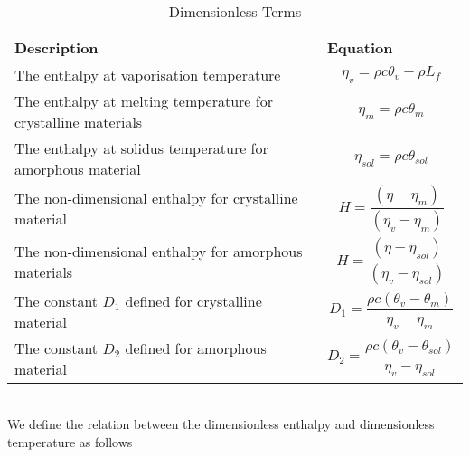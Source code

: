 \begin{table}[htbp]
\begin{tabular}{|m{27em}|m{12em}|} %
\hline
\textbf{Description} & \textbf{Equation} \\ %
\hline %
The enthalpy at vaporisation temperature &  \begin{equation}
    \eta_v = \rho c \theta_v + \rho L_f \label{eq:Enthalpy_vapour}
\end{equation} \\
\hline
The enthalpy at melting temperature for crystalline materials & \begin{equation}  \eta_m = \rho c \theta_m  \end{equation}\\
\hline
The enthalpy at solidus temperature for amorphous material & \begin{equation}\eta_{sol}=\rho c \theta_{sol} \end{equation}\\
\hline
The non-dimensional enthalpy for crystalline material & \begin{equation} H = \frac{(\eta - \eta_m )}{(\eta_v - \eta_m)}\end{equation} \\
\hline
The non-dimensional enthalpy for amorphous materials & \begin{equation}H = \frac{(\eta - \eta_{sol} )}{(\eta_v - \eta_{sol})} \label{eq:liqudiousnonenahlpy}\end{equation}\\
\hline
The constant $D_1$ defined for crystalline material & \begin{equation} D_1 = \frac{\rho c (\theta_v - \theta_m)}{\eta_v - \eta_m}\end{equation}\\
\hline
The constant $D_2$ defined for amorphous material & \begin{equation}D_2 = \frac{\rho c (\theta_v - \theta_{sol})}{\eta_v - \eta_{sol}} \label{eq:D2_constant}\end{equation}\\
\hline
\end{tabular}
\caption{Dimensionless Terms}
\label{tabel:Dedimensionalisation}
\end{table}\\
We define the relation between the dimensionless enthalpy and dimensionless temperature as follows\\\\
